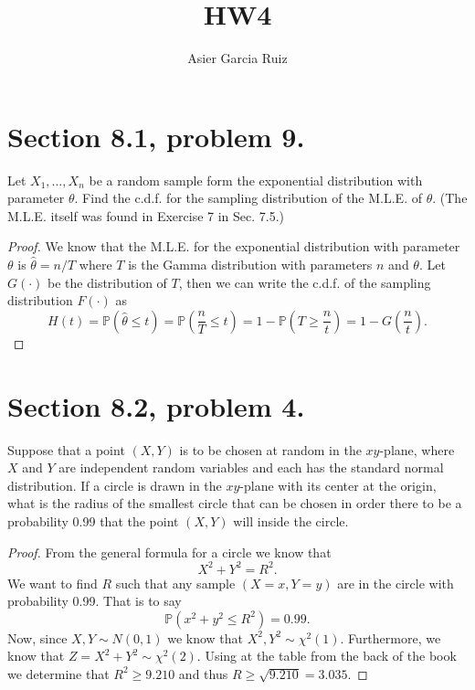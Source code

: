 \documentclass{article}
\title{HW4}
\author{Asier Garcia Ruiz}
\renewcommand{\P}[1]{\mathbb{P}\left(#1\right)}
\newcommand{\randsamp}{X_1,\dots,X_n}
\newcommand{\cdf}{c.d.f. }
\newcommand{\mle}{M.L.E. }
\newenvironment{hwproof}[1]
{
    #1
    \begin{proof}
}{
    \end{proof}
}
\begin{document}
\maketitle

\section{Section 8.1, problem 9.}
\begin{hwproof}
    {
        Let $\randsamp$ be a random sample form the exponential distribution with
        parameter $\theta$. Find the \cdf for the sampling distribution of the
        \mle of $\theta$. (The \mle itself was found in Exercise 7 in Sec. 7.5.)
    }

    We know that the \mle for the exponential distribution with parameter $\theta$
    is $\hat{\theta} = n / T$ where $T$ is the Gamma distribution with parameters
    $n$ and $\theta$. Let $G(\cdot)$ be the distribution of $T$, then we can write
    the \cdf of the sampling distribution $F(\cdot)$ as
    \begin{equation*}
        H(t) = \P{\hat{\theta} \leq t} = \P{\frac{n}{T} \leq t}
        = 1 - \P{T \geq \frac{n}{t} } = 1 - G\left(\frac{n}{t}\right).
    \end{equation*}
\end{hwproof}

\section{Section 8.2, problem 4.}
\begin{hwproof}
    {
        Suppose that a point $(X,Y)$ is to be chosen at random in the $xy$-plane,
        where $X$ and $Y$ are independent random variables and each has the standard
        normal distribution. If a circle is drawn in the $xy$-plane with its center
        at the origin, what is the radius of the smallest circle that can be chosen
        in order there to be a probability 0.99 that the point $(X,Y)$ will inside
        the circle.
    }
    From the general formula for a circle we know that
    \begin{equation*}
        X^2 + Y^2 = R^2.
    \end{equation*}
    We want to find $R$ such that any sample $(X=x, Y=y)$ are in the circle with
    probability 0.99. That is to say
    \begin{equation*}
        \P{x^2 + y^2 \leq R^2} = 0.99.
    \end{equation*}
    Now, since $X, Y \sim N(0,1)$ we know that $X^2, Y^2 \sim \chi^2(1)$.
    Furthermore, we know that $Z = X^2 + Y^2 \sim \chi^2(2)$. Using at the table
    from the back of the book we determine that $R^2 \geq 9.210$ and thus
    $R \geq \sqrt{9.210} = 3.035$.
\end{hwproof}
\end{document}
